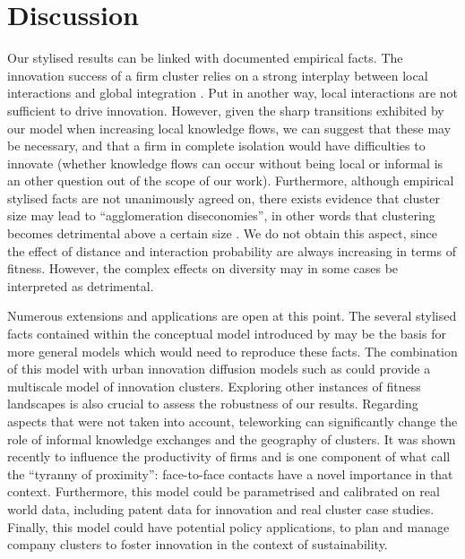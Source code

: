 \documentclass[letterpaper]{article}
\begin{document}
\section{Discussion}



Our stylised results can be linked with documented empirical facts. The innovation success of a firm cluster relies on a strong interplay between local interactions and global integration \citep{fitjar2014local}. Put in another way, local interactions are not sufficient to drive innovation. However, given the sharp transitions exhibited by our model when increasing local knowledge flows, we can suggest that these may be necessary, and that a firm in complete isolation would have difficulties to innovate (whether knowledge flows can occur without being local or informal is an other question out of the scope of our work). Furthermore, although empirical stylised facts are not unanimously agreed on, there exists evidence that cluster size may lead to ``agglomeration diseconomies'', in other words that clustering becomes detrimental above a certain size \cite{folta2006geographic}. We do not obtain this aspect, since the effect of distance and interaction probability are always increasing in terms of fitness. However, the complex effects on diversity may in some cases be interpreted as detrimental.

Numerous extensions and applications are open at this point. The several stylised facts contained within the conceptual model introduced by \cite{gnyawali2013complementary} may be the basis for more general models which would need to reproduce these facts. The combination of this model with urban innovation diffusion models such as \cite{raimbault2020model} could provide a multiscale model of innovation clusters. Exploring other instances of fitness landscapes is also crucial to assess the robustness of our results. Regarding aspects that were not taken into account, teleworking can significantly change the role of informal knowledge exchanges and the geography of clusters. It was shown recently to influence the productivity of firms \citep{bergeaud4015066telework} and is one component of what \cite{duranton1999distance} call the ``tyranny of proximity'': face-to-face contacts have a novel importance in that context. Furthermore, this model could be parametrised and calibrated on real world data, including patent data for innovation and real cluster case studies. Finally, this model could have potential policy applications, to plan and manage company clusters to foster innovation in the context of sustainability.
\end{document}
